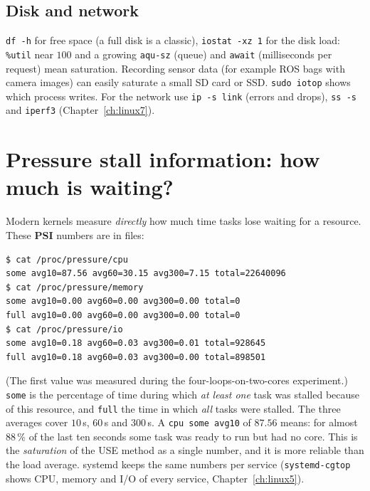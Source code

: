 \subsection*{Disk and network}
\texttt{df -h} for free space (a full disk is a classic), \texttt{iostat -xz 1} for the disk load: \texttt{\%util} near $100$ and a growing \texttt{aqu-sz} (queue) and \texttt{await} (milliseconds per request) mean saturation. Recording sensor data (for example ROS bags with camera images) can easily saturate a small SD card or SSD. \verb|sudo iotop| shows which process writes. For the network use \texttt{ip -s link} (errors and drops), \texttt{ss -s} and \texttt{iperf3} (Chapter~\ref{ch:linux7}).

\section*{Pressure stall information: how much is waiting?}
Modern kernels measure \emph{directly} how much time tasks lose waiting for a resource. These \textbf{PSI} numbers are in files:
\begin{verbatim}
$ cat /proc/pressure/cpu
some avg10=87.56 avg60=30.15 avg300=7.15 total=22640096
$ cat /proc/pressure/memory
some avg10=0.00 avg60=0.00 avg300=0.00 total=0
full avg10=0.00 avg60=0.00 avg300=0.00 total=0
$ cat /proc/pressure/io
some avg10=0.18 avg60=0.03 avg300=0.01 total=928645
full avg10=0.18 avg60=0.03 avg300=0.00 total=898501
\end{verbatim}
(The first value was measured during the four-loops-on-two-cores experiment.) \texttt{some} is the percentage of time during which \emph{at least one} task was stalled because of this resource, and \texttt{full} the time in which \emph{all} tasks were stalled. The three averages cover $10$\,s, $60$\,s and $300$\,s. A \texttt{cpu some avg10} of $87.56$ means: for almost $88\,\%$ of the last ten seconds some task was ready to run but had no core. This is the \emph{saturation} of the USE method as a single number, and it is more reliable than the load average. systemd keeps the same numbers per service (\verb|systemd-cgtop| shows CPU, memory and I/O of every service, Chapter~\ref{ch:linux5}).


